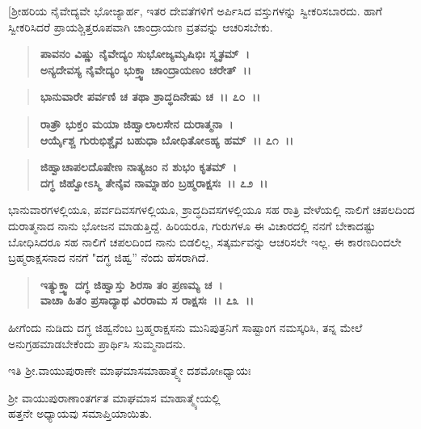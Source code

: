 [ಶ‍್ರೀಹರಿಯ ನೈವೇದ್ಯವೇ ಭೋಜ್ಯಾರ್ಹ, ಇತರ ದೇವತೆಗಳಿಗೆ ಅರ್ಪಿಸಿದ ವಸ್ತುಗಳನ್ನು ಸ್ವೀಕರಿಸಬಾರದು. ಹಾಗೆ ಸ್ವೀಕರಿಸಿದರೆ ಪ್ರಾಯಶ್ಚಿತ್ತರೂಪವಾಗಿ ಚಾಂದ್ರಾಯಣ ವ್ರತವನ್ನು ಆಚರಿಸಬೇಕು.

\begin{verse}
\textbf{ಪಾವನಂ ವಿಷ್ಣು ನೈವೇದ್ಯಂ ಸುಭೋಜ್ಯಮೃಷಿಭಿಃ ಸ್ಮೃತಮ್~।}\\\textbf{ಅನ್ಯದೇವಸ್ಯ ನೈವೇದ್ಯಂ ಭುಕ್ತ್ವಾ ಚಾಂದ್ರಾಯಣಂ ಚರೇತ್~।।}
\end{verse}

\vauthor{\textbf{(ಶ‍್ರೀ ಕೃಷ್ಣಾಮೃತಮಹಾರ್ಣವ)]}}

\begin{verse}
\textbf{ಭಾನುವಾರೇ ಪರ್ವಣಿ ಚ ತಥಾ ಶ್ರಾದ್ಧದಿನೇಷು ಚ~।। ೭೦~।।} 
\end{verse}

\begin{verse}
\textbf{ರಾತ್ರೌ ಭುಕ್ತಂ ಮಯಾ ಜಿಹ್ವಾಲಾಲಸೇನ ದುರಾತ್ಮನಾ~।}\\\textbf{ಆರ್ಯೈಶ್ಚ ಗುರುಭಿಶ್ಚೈವ ಬಹುಧಾ ಬೋಧಿತೋಽಹ್ಯ ಹಮ್~।। ೭೧~।। }
\end{verse}

\begin{verse}
\textbf{ಜಿಹ್ವಾಚಾಪಲದೊಷೇಣ ನಾತ್ಯಜಂ ನ ಶುಭಂ ಕೃತಮ್~।}\\\textbf{ದಗ್ಧ ಜಿಹ್ವೋಽಸ್ಮಿ ತೇನೈವ ನಾಮ್ನಾಹಂ ಬ್ರಹ್ಮರಾಕ್ಷಸಃ~।। ೭೨~।।}
\end{verse}

ಭಾನುವಾರಗಳಲ್ಲಿಯೂ, ಪರ್ವದಿವಸಗಳಲ್ಲಿಯೂ, ಶ್ರಾದ್ಧದಿವಸಗಳಲ್ಲಿಯೂ ಸಹ ರಾತ್ರಿ ವೇಳೆಯಲ್ಲಿ ನಾಲಿಗೆ ಚಪಲದಿಂದ ದುರಾತ್ಮನಾದ ನಾನು ಭೋಜನ ಮಾಡುತ್ತಿದ್ದೆ. ಹಿರಿಯರೂ, ಗುರುಗಳೂ ಈ ವಿಚಾರದಲ್ಲಿ ನನಗೆ ಬೇಕಾದಷ್ಟು ಬೋಧಿಸಿದರೂ ಸಹ ನಾಲಿಗೆ ಚಪಲದಿಂದ ನಾನು ಬಿಡಲಿಲ್ಲ, ಸತ್ಕರ್ಮವನ್ನು ಆಚರಿಸಲೇ ಇಲ್ಲ. ಈ ಕಾರಣದಿಂದಲೇ ಬ್ರಹ್ಮರಾಕ್ಷಸನಾದ ನನಗೆ "ದಗ್ಧ ಜಿಹ್ವ” ನೆಂದು ಹೆಸರಾಗಿದೆ.

\begin{verse}
\textbf{ಇತ್ಯುಕ್ತ್ವಾ ದಗ್ಧ ಜಿಹ್ವಾಸ್ತು ಶಿರಸಾ ತಂ ಪ್ರಣಮ್ಯ ಚ~।}\\\textbf{ವಾಚಾ ಹಿತಂ ಪ್ರಸಾದ್ಯಾಥ ವಿರರಾಮ ಸ ರಾಕ್ಷಸಃ~।। ೭೩~।।}
\end{verse}

ಹೀಗೆಂದು ನುಡಿದು ದಗ್ಧ ಜಿಹ್ವನೆಂಬ ಬ್ರಹ್ಮರಾಕ್ಷಸನು ಮುನಿಪುತ್ರನಿಗೆ ಸಾಷ್ಟಾಂಗ ನಮಸ್ಕರಿಸಿ, ತನ್ನ ಮೇಲೆ ಅನುಗ್ರಹಮಾಡಬೇಕೆಂದು ಪ್ರಾರ್ಥಿಸಿ ಸುಮ್ಮನಾದನು.

\begin{center}
ಇತಿ ಶ‍್ರೀ.ವಾಯುಪುರಾಣೇ ಮಾಘಮಾಸಮಾಹಾತ್ಮ್ಯೇ ದಶಮೋsಧ್ಯಾಯಃ
\end{center}

\begin{center}
ಶ‍್ರೀ ವಾಯುಪುರಾಣಾಂತರ್ಗತ ಮಾಘಮಾಸ ಮಾಹಾತ್ಮ್ಯೇಯಲ್ಲಿ \\ ಹತ್ತನೇ ಅಧ್ಯಾಯವು ಸಮಾಪ್ತಿಯಾಯಿತು.
\end{center}

